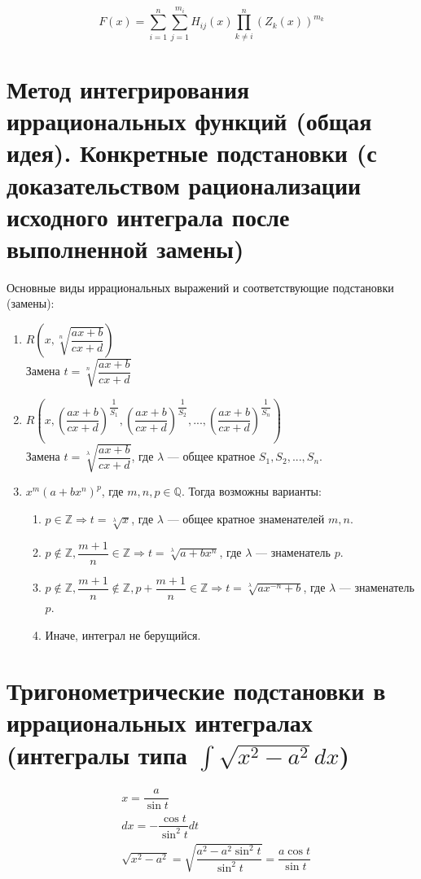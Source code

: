 \documentclass[12pt]{article}
\begin{document}
\begin{equation}
    F(x) = \sum^n_{i=1} \sum^{m_i}_{j = 1} H_{ij}(x)\prod_{k \neq i}^{n}(Z_k(x))^{m_k}
\end{equation}

\section{Метод интегрирования иррациональных функций (общая идея). Конкретные подстановки (с доказательством рационализации исходного интеграла после выполненной замены)}
Основные виды иррациональных выражений и соответствующие подстановки (замены):
\begin{enumerate}
    \item $R\left(x, \sqrt[n]{\dfrac{ax + b}{cx + d}}\right)$ \\
          Замена $t = \sqrt[n]{\dfrac{ax + b}{cx + d}}$
    \item $R\left(x, \left(\dfrac{ax + b}{cx + d}\right)^\dfrac{1}{S_1}, \left(\dfrac{ax + b}{cx + d}\right)^\dfrac{1}{S_2}, ..., \left(\dfrac{ax + b}{cx + d}\right)^\dfrac{1}{S_n}\right)$ \\
          Замена $t = \sqrt[\lambda]{\dfrac{ax + b}{cx + d}}$, где $\lambda$ — общее кратное $S_1, S_2, ..., S_n$.
    \item $x^m(a + bx^n)^p$, где $m, n, p \in \mathbb{Q}$.
          Тогда возможны варианты:
          \begin{enumerate}[label*=\arabic*]
              \item $p \in \mathbb{Z} \Rightarrow t = \sqrt[\lambda]{x}$, где $\lambda$ — общее кратное знаменателей $m, n$.
              \item $p \notin \mathbb{Z}, \dfrac{m + 1}{n} \in \mathbb{Z} \Rightarrow t = \sqrt[\lambda]{a + bx^n}$, где $\lambda$ — знаменатель $p$.
              \item $p \notin \mathbb{Z}, \dfrac{m + 1}{n} \notin \mathbb{Z}, p + \dfrac{m + 1}{n} \in \mathbb{Z} \Rightarrow t = \sqrt[\lambda]{ax^{-n} + b}$, где $\lambda$ — знаменатель $p$.
              \item Иначе, интеграл не берущийся.
          \end{enumerate}
\end{enumerate}

\section{Тригонометрические подстановки в иррациональных интегралах (интегралы типа $\int \sqrt{x^2 - a^2}dx$)}
\[
    \begin{aligned}
         & x = \dfrac{a}{\sin t}                                                                   \\
         & dx = -\dfrac{\cos t}{\sin^2t}dt                                                         \\
         & \sqrt{x^2 - a^2} = \sqrt{\dfrac{a^2 - a^2\sin^2 t}{\sin^2 t}} = \dfrac{a\cos t}{\sin t}
    \end{aligned}
\]
\end{document}
